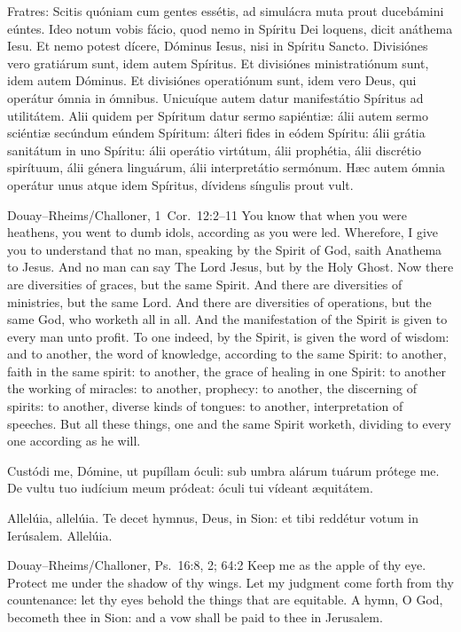 Fratres: Scitis quóniam cum gentes essétis, ad simulácra muta prout ducebámini
eúntes. Ideo notum vobis fácio, quod nemo in Spíritu Dei loquens, dicit
anáthema Iesu. Et nemo potest dícere, Dóminus Iesus, nisi in Spíritu Sancto.
Divisiónes vero gratiárum sunt, idem autem Spíritus. Et divisiónes
ministratiónum sunt, idem autem Dóminus. Et divisiónes operatiónum sunt, idem
vero Deus, qui operátur ómnia in ómnibus. Unicuíque autem datur manifestátio
Spíritus ad utilitátem. Alii quidem per Spíritum datur sermo sapiéntiæ: álii
autem sermo sciéntiæ secúndum eúndem Spíritum: álteri fides in eódem Spíritu:
álii grátia sanitátum in uno Spíritu: álii operátio virtútum, álii prophétia,
álii discrétio spirítuum, álii génera linguárum, álii interpretátio sermónum.
Hæc autem ómnia operátur unus atque idem Spíritus, dívidens síngulis prout
vult.
\finishfulltextelement
\begin{fulltextenglish}{Douay--Rheims/Challoner, 1~Cor.~12:2--11}
You know that when you were heathens, you went to dumb idols, according as you
were led. Wherefore, I give you to understand that no man, speaking by the
Spirit of God, saith Anathema to Jesus. And no man can say The Lord Jesus, but
by the Holy Ghost. Now there are diversities of graces, but the same Spirit.
And there are diversities of ministries, but the same Lord. And there are
diversities of operations, but the same God, who worketh all in all. And the
manifestation of the Spirit is given to every man unto profit. To one indeed,
by the Spirit, is given the word of wisdom: and to another, the word of
knowledge, according to the same Spirit: to another, faith in the same spirit:
to another, the grace of healing in one Spirit: to another the working of
miracles: to another, prophecy: to another, the discerning of spirits: to
another, diverse kinds of tongues: to another, interpretation of speeches. But
all these things, one and the same Spirit worketh, dividing to every one
according as he will.
\end{fulltextenglish}

Custódi me, Dómine, ut pupíllam óculi: sub umbra alárum tuárum prótege me.
\medskip\noindent{} De vultu tuo iudícium meum pródeat: óculi tui
vídeant æquitátem.

\medskip\noindent Allelúia, allelúia.  Te decet hymnus, Deus, in
Sion: et tibi reddétur votum in Ierúsalem. Allelúia.
\finishfulltextelement
\begin{fulltextenglish}{Douay--Rheims/Challoner, Ps.~16:8, 2; 64:2}
Keep me as the apple of thy eye. Protect me under the shadow of thy wings.
Let my judgment come forth from thy countenance: let thy eyes behold the
things that are equitable. A hymn, O God, becometh thee in Sion: and a vow
shall be paid to thee in Jerusalem.
\end{fulltextenglish}

